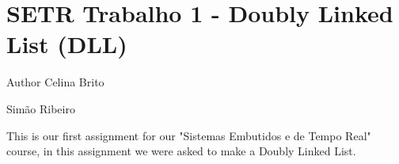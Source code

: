 \chapter{SETR Trabalho 1 -\/ Doubly Linked List (DLL)}
\hypertarget{index}{}\label{index}
\begin{DoxyAuthor}{Author}
Celina Brito 

Simão Ribeiro
\end{DoxyAuthor}
This is our first assignment for our "{}\+Sistemas Embutidos e de Tempo Real"{} course, in this assignment we were asked to make a Doubly Linked List. 